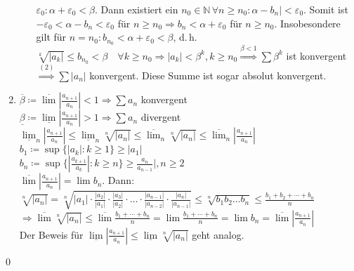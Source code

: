 \documentclass[ngerman,titlepage,twoside, parskip=half*]{scrreprt}
\newcommand*{\N}{\mathbb{N}}
\theoremstyle{plain}
\theoremstyle{definition}
\theoremstyle{remark}
\begin{document}
\begin{enumerate}[(1)]
\begin{enumerate}[1. F{a}ll]
      $\varepsilon_0\colon\alpha+\varepsilon_0<\beta$. Dann existiert ein $n_0
      \in \N\,\forall n\geq n_0\colon\alpha -b_n|<\varepsilon_0$. Somit ist $-\varepsilon_0<\alpha -b_n<\varepsilon_0$ für $n\geq n_0
	\Rightarrow b_n<\alpha +\varepsilon_0$ für $n\geq n_0$. Insobesondere gilt für $n=n_0\colon b_{n_0}<\alpha +\varepsilon_0<
	\beta$, d.\,h. $\sqrt[k]{|a_k|}\leq b_{n_0}<\beta \quad \forall k\geq n_0 \Rightarrow |a_k|<\beta^k, k\geq n_0
	\stackrel{\beta <1}{\Rightarrow} \sum \beta^k$ ist konvergent $\stackrel{(2)}{\Rightarrow} \sum |a_n|$ konvergent.
	Diese Summe ist sogar absolut konvergent.
    \end{enumerate}
  \item $\overline{\beta}\coloneqq\overline{\lim}|\frac{a_{n+1}}{a_n}|<1 \Rightarrow \sum a_n$ konvergent\\
    $\underline{\beta}\coloneqq\underline{\lim}|\frac{a_{n+1}}{a_n}|>1 \Rightarrow \sum a_n$ divergent\\
    $\underline{\lim}_n|\frac{a_{n+1}}{a_n}|\leq \underline{\lim}_n \sqrt[n]{|a_n|}\leq \overline{\lim}_n \sqrt[n]{|a_n|}
    \leq \overline{\lim}_n |\frac{a_{n+1}}{a_n}|$\\
    $b_1\coloneqq\sup \{|a_k|\colon k\geq 1\}\geq |a_1|$\\
    $b_n\coloneqq\sup \{|\frac{a_{k+1}}{a_k}|\colon k\geq n\}\geq \frac{a_n}{a_{n-1}}|, n\geq 2$\\
    $\overline{\lim}|\frac{a_{n+1}}{a_n}|=\lim b_n$. Dann:\\
    $\sqrt[n]{|a_n|}=\sqrt[n]{|a_1|\cdot \frac{|a_2|}{|a_1|}\cdot \frac{|a_3|}{|a_2|}\cdot \ldots \cdot 
    \frac{|a_{n-1}|}{|a_{n-2}|}\cdot \frac{|a_n|}{|a_{n-1}|}} \leq \sqrt[n]{b_1b_2\ldots b_n}\leq 
    \frac{b_1+b_2+\cdots +b_n}{n}$\\
    $\Rightarrow \overline{\lim} \sqrt[n]{|a_n|}\leq \overline{\lim}
    \frac{b_1+\cdots +b_n}{n}=\lim \frac{b_1+\cdots +b_n}{n}=\lim b_n=\overline{\lim} |\frac{a_{n+1}}{a_n}|$\\
    Der Beweis für $\underline{\lim}|\frac{a_{n+1}}{a_n}|\leq \underline{\lim} \sqrt[n]{|a_n|}$ geht analog.
\end{enumerate}
\qed
\end{document}
